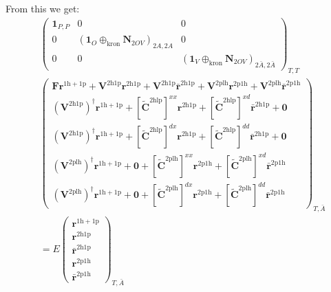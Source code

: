 From this we get:
\begin{align}
&
\begin{pmatrix}
\bm{1}_{P,P} & 0 & 0 \\
0 & \left(\bm{1}_{O} \oplus_{\text{kron}} \bm{N}_{2OV}\right)_{2A,2A} & 0 \\
0 & 0 & \left(\bm{1}_V \oplus_{\text{kron}} \bm{N}_{2OV}\right)_{2\bar{A},2\bar{A}}
\end{pmatrix}_{T,T} \\
&
\begin{pmatrix}
\bm{F}\bm{r}^{1\mathrm{h}+1\mathrm{p}} + \bm{V}^{2\mathrm{h}1\mathrm{p}}\bm{r}^{2\mathrm{h}1\mathrm{p}} + \bm{V}^{2\mathrm{h}1\mathrm{p}}\bm{\bar{r}}^{2\mathrm{h}1\mathrm{p}} + \bm{V}^{2\mathrm{plh}}\bm{r}^{2\mathrm{p}1\mathrm{h}} + \bm{V}^{2\mathrm{plh}}\bm{\bar{r}}^{2\mathrm{p}1\mathrm{h}} \\
\left(\bm{V}^{2\mathrm{h1p}}\right)^{\dagger} \bm{r}^{1\mathrm{h}+1\mathrm{p}} + [\bm{\tilde{C}}^{2\mathrm{hlp}}]^{xx} \bm{r}^{2\mathrm{h}1\mathrm{p}} + [\bm{\tilde{C}}^{2\mathrm{hlp}}]^{xd} \bm{\bar{r}}^{2\mathrm{h}1\mathrm{p}} + \bm{0} \\
\left(\bm{V}^{2\mathrm{h1p}}\right)^{\dagger} \bm{r}^{1\mathrm{h}+1\mathrm{p}} + [\bm{\tilde{C}}^{2\mathrm{hlp}}]^{dx} \bm{r}^{2\mathrm{h}1\mathrm{p}} + [\bm{\tilde{C}}^{2\mathrm{hlp}}]^{dd} \bm{\bar{r}}^{2\mathrm{h}1\mathrm{p}} + \bm{0} \\
\left(\bm{V}^{2\mathrm{plh}}\right)^{\dagger} \bm{r}^{1\mathrm{h}+1\mathrm{p}} + \bm{0} + [\bm{\tilde{C}}^{2\mathrm{plh}}]^{xx} \bm{r}^{2\mathrm{p}1\mathrm{h}} + [\bm{\tilde{C}}^{2\mathrm{plh}}]^{xd} \bm{\bar{r}}^{2\mathrm{p}1\mathrm{h}} \\
\left(\bm{V}^{2\mathrm{plh}}\right)^{\dagger} \bm{r}^{1\mathrm{h}+1\mathrm{p}} + \bm{0} + [\bm{\tilde{C}}^{2\mathrm{plh}}]^{dx} \bm{r}^{2\mathrm{p}1\mathrm{h}} + [\bm{\tilde{C}}^{2\mathrm{plh}}]^{dd} \bm{\bar{r}}^{2\mathrm{p}1\mathrm{h}}
\end{pmatrix}_{T,\bar{A}}\\ &= E
\begin{pmatrix}
\bm{r}^{1\mathrm{h}+1\mathrm{p}} \\
\bm{r}^{2\mathrm{h}1\mathrm{p}} \\
\bm{\bar{r}}^{2\mathrm{h}1\mathrm{p}} \\
\bm{r}^{2\mathrm{p}1\mathrm{h}} \\
\bm{\bar{r}}^{2\mathrm{p}1\mathrm{h}}
\end{pmatrix}_{T,\bar{A}}
\end{align}
